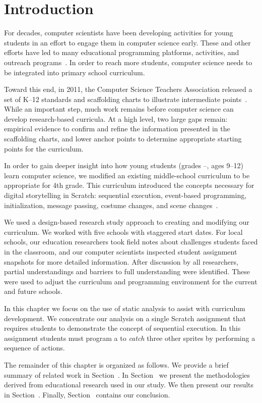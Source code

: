 \section{Introduction}
For decades, computer scientists have been developing activities for young
students in an effort to engage them in computer science early. These and other
efforts have led to many educational programming platforms, activities, and
outreach programs~\cite{wayanoutpost, georgiaoutreach,
  Franklin:2011:ATA:1953163.1953295, Maloney:2010:SPL:1868358.1868363,
  Dann:2000:MCP:343048.343070, Hood:2005:TPL:1067445.1067454, csunplugged}. In
order to reach more students, computer science needs to be integrated into
primary school curriculum.

Toward this end, in 2011, the Computer Science Teachers Association released a
set of K--12 standards and scaffolding charts to illustrate intermediate
points~\cite{cstastandards}. While an important step, much work remains before
computer science can develop research-based curricula. At a high level, two
large gaps remain: empirical evidence to confirm and refine the information
presented in the scaffolding charts, and lower anchor points to determine
appropriate starting points for the curriculum.

In order to gain deeper insight into how young students (grades
--, ages 9--12) learn computer science, we modified an existing
middle-school curriculum to be appropriate for 4th grade. This curriculum
introduced the concepts necessary for digital storytelling in Scratch:
sequential execution, event-based programming, initialization, message passing,
costume changes, and scene changes~\cite{Franklin:2013:SBO}.

We used a design-based research study approach to creating and modifying our
curriculum. We worked with five schools with staggered start dates. For local
schools, our education researchers took field notes about challenges students
faced in the classroom, and our computer scientists inspected student
assignment snapshots for more detailed information. After discussion by all
researchers, partial understandings and barriers to full understanding were
identified. These were used to adjust the curriculum and programming
environment for the current and future schools.

In this chapter we focus on the use of static analysis to assist with
curriculum development. We concentrate our analysis on a single Scratch
assignment that requires students to demonstrate the concept of sequential
execution. In this assignment students must program a \net{} to \emph{catch}
three other sprites by performing a sequence of actions.

The remainder of this chapter is organized as follows. We provide a brief
summary of related work in Section~. In
Section~ we present the methodologies derived from
educational research used in our study. We then present our results in
Section~. Finally, Section~
contains our conclusion.
